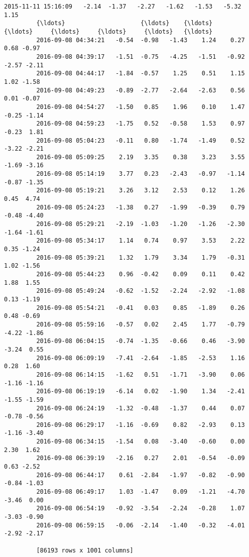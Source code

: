 \documentclass[a4paper,dvipdfmx]{jsarticle}
\begin{document}
\begin{Verbatim}[commandchars=\\\{\}]
         2015-11-11 15:16:09   -2.14  -1.37   -2.27   -1.62   -1.53   -5.32  1.15  
         {\ldots}                     {\ldots}    {\ldots}     {\ldots}     {\ldots}     {\ldots}     {\ldots}   {\ldots}  
         2016-09-08 04:34:21   -0.54  -0.98   -1.43    1.24    0.27    0.68 -0.97  
         2016-09-08 04:39:17   -1.51  -0.75   -4.25   -1.51   -0.92   -2.57 -2.11  
         2016-09-08 04:44:17   -1.84  -0.57    1.25    0.51    1.15    1.02 -1.58  
         2016-09-08 04:49:23   -0.89  -2.77   -2.64   -2.63    0.56    0.01 -0.07  
         2016-09-08 04:54:27   -1.50   0.85    1.96    0.10    1.47   -0.25 -1.14  
         2016-09-08 04:59:23   -1.75   0.52   -0.58    1.53    0.97   -0.23  1.81  
         2016-09-08 05:04:23   -0.11   0.80   -1.74   -1.49    0.52   -3.22 -2.21  
         2016-09-08 05:09:25    2.19   3.35    0.38    3.23    3.55   -1.69 -3.16  
         2016-09-08 05:14:19    3.77   0.23   -2.43   -0.97   -1.14   -0.87 -1.35  
         2016-09-08 05:19:21    3.26   3.12    2.53    0.12    1.26    0.45  4.74  
         2016-09-08 05:24:23   -1.38   0.27   -1.99   -0.39    0.79   -0.48 -4.40  
         2016-09-08 05:29:21   -2.19  -1.03   -1.20   -1.26   -2.30   -1.64 -1.61  
         2016-09-08 05:34:17    1.14   0.74    0.97    3.53    2.22    0.35 -1.24  
         2016-09-08 05:39:21    1.32   1.79    3.34    1.79   -0.31    1.02 -1.56  
         2016-09-08 05:44:23    0.96  -0.42    0.09    0.11    0.42    1.88  1.55  
         2016-09-08 05:49:24   -0.62  -1.52   -2.24   -2.92   -1.08    0.13 -1.19  
         2016-09-08 05:54:21   -0.41   0.03    0.85   -1.89    0.26    0.48 -0.69  
         2016-09-08 05:59:16   -0.57   0.02    2.45    1.77   -0.79   -4.22 -1.86  
         2016-09-08 06:04:15   -0.74  -1.35   -0.66    0.46   -3.90   -3.24  0.55  
         2016-09-08 06:09:19   -7.41  -2.64   -1.85   -2.53    1.16    0.28  1.60  
         2016-09-08 06:14:15   -1.62   0.51   -1.71   -3.90    0.06   -1.16 -1.16  
         2016-09-08 06:19:19   -6.14   0.02   -1.90    1.34   -2.41   -1.55 -1.59  
         2016-09-08 06:24:19   -1.32  -0.48   -1.37    0.44    0.07   -0.78 -0.56  
         2016-09-08 06:29:17   -1.16  -0.69    0.82   -2.93    0.13   -1.16 -3.40  
         2016-09-08 06:34:15   -1.54   0.08   -3.40   -0.60    0.00    2.30  1.62  
         2016-09-08 06:39:19   -2.16   0.27    2.01   -0.54   -0.09    0.63 -2.52  
         2016-09-08 06:44:17    0.61  -2.84   -1.97   -0.82   -0.90   -0.84 -1.03  
         2016-09-08 06:49:17    1.03  -1.47    0.09   -1.21   -4.70   -3.46  0.00  
         2016-09-08 06:54:19   -0.92  -3.54   -2.24   -0.28    1.07   -3.03 -0.90  
         2016-09-08 06:59:15   -0.06  -2.14   -1.40   -0.32   -4.01   -2.92 -2.17  
         
         [86193 rows x 1001 columns]
\end{Verbatim}
        
\end{document}
